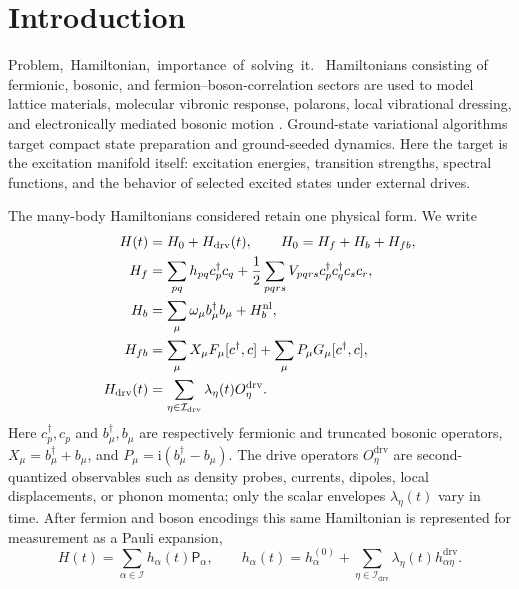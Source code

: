 \documentclass[
  reprint,
  amsmath,
  amssymb,
  aps,
  pra,
  nofootinbib,
  superscriptaddress,
  floatfix
]{revtex4-2}
\newcommand{\tentative}[1]{\textcolor{red!70!black}{#1}}
\newcommand{\structlabel}[1]{\noindent\mbox{\tentative{#1.}}~}
\newcommand{\ii}{\mathrm{i}}
\newcommand{\drv}{\mathrm{drv}}
\begin{document}
\maketitle

\section{Introduction}

\structlabel{Problem, Hamiltonian, importance of solving it}
Hamiltonians consisting of fermionic, bosonic, and fermion--boson-correlation sectors are used to model lattice materials, molecular vibronic response, polarons, local vibrational dressing, and electronically mediated bosonic motion \cite{Hubbard1963,Holstein1959,Macridin2018ElectronPhonon,Sawaya2020DLevel,Li2023VBSElectronPhonon,Backes2023HHDMFT,Denner2023HybridEP,Dutta2024BosonicChemistry,Peng2025BosonHamiltonians}.  Ground-state variational algorithms target compact state preparation and ground-seeded dynamics.  Here the target is the excitation manifold itself: excitation energies, transition strengths, spectral functions, and the behavior of selected excited states under external drives.

The many-body Hamiltonians considered retain one physical form.  We write
\begin{align}
H(t)&=H_0+H_{\drv}(t),
\qquad
H_0=H_f+H_b+H_{fb},
\nonumber\\
H_f&=\sum_{pq}h_{pq}c_p^\dagger c_q
+\frac12\sum_{pqrs}V_{pqrs}c_p^\dagger c_q^\dagger c_s c_r,
\nonumber\\
H_b&=\sum_{\mu}\omega_\mu b_\mu^\dagger b_\mu+H_b^{\rm nl},
\nonumber\\
H_{fb}&=\sum_{\mu}X_\mu F_\mu[c^\dagger,c]
+\sum_{\mu}P_\mu G_\mu[c^\dagger,c],
\nonumber\\
H_{\drv}(t)&=\sum_{\eta\in\mathcal I_{\drv}}\lambda_\eta(t)O_\eta^{\drv}.
\label{eq:general_fb_terms}
\end{align}
Here $c_p^\dagger,c_p$ and $b_\mu^\dagger,b_\mu$ are respectively fermionic and truncated bosonic operators, $X_\mu=b_\mu^\dagger+b_\mu$, and $P_\mu=\ii(b_\mu^\dagger-b_\mu)$.  The drive operators $O_\eta^{\drv}$ are second-quantized observables such as density probes, currents, dipoles, local displacements, or phonon momenta; only the scalar envelopes $\lambda_\eta(t)$ vary in time.  After fermion and boson encodings this same Hamiltonian is represented for measurement as a Pauli expansion,
\begin{equation}
H(t)=\sum_{\alpha\in\mathcal I}h_\alpha(t)\mathsf P_\alpha,
\qquad
h_\alpha(t)=h_\alpha^{(0)}
+\sum_{\eta\in\mathcal I_{\drv}}\lambda_\eta(t)h_{\alpha\eta}^{\drv}.
\label{eq:pauli_hamiltonian_intro}
\end{equation}
\end{document}
